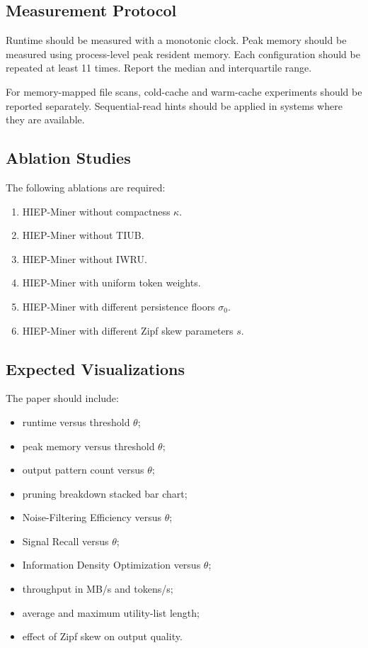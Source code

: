 \documentclass[11pt,a4paper]{article}
\begin{document}
\subsection{Measurement Protocol}

Runtime should be measured with a monotonic clock. Peak memory should be measured using process-level peak resident memory. Each configuration should be repeated at least 11 times. Report the median and interquartile range.

For memory-mapped file scans, cold-cache and warm-cache experiments should be reported separately. Sequential-read hints should be applied in systems where they are available.

\subsection{Ablation Studies}

The following ablations are required:

\begin{enumerate}[label=(A\arabic*)]
    \item HIEP-Miner without compactness \(\kappa\).
    \item HIEP-Miner without TIUB.
    \item HIEP-Miner without IWRU.
    \item HIEP-Miner with uniform token weights.
    \item HIEP-Miner with different persistence floors \(\sigma_0\).
    \item HIEP-Miner with different Zipf skew parameters \(s\).
\end{enumerate}

\subsection{Expected Visualizations}

The paper should include:

\begin{itemize}
    \item runtime versus threshold \(\theta\);
    \item peak memory versus threshold \(\theta\);
    \item output pattern count versus \(\theta\);
    \item pruning breakdown stacked bar chart;
    \item Noise-Filtering Efficiency versus \(\theta\);
    \item Signal Recall versus \(\theta\);
    \item Information Density Optimization versus \(\theta\);
    \item throughput in MB/s and tokens/s;
    \item average and maximum utility-list length;
    \item effect of Zipf skew on output quality.
\end{itemize}
\end{document}
